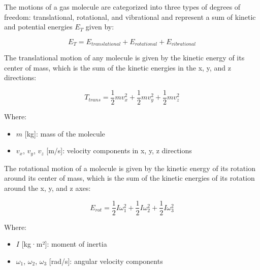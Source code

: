 \documentclass[../main]{subfiles}
\begin{document}
The motions of a gas molecule are categorized into three types of degrees of freedom: translational, rotational, and vibrational and represent a sum of kinetic and potential energies ${E_{T}}$ given by:

\vspace{0mm}
\begin{equation}
    E_{T} = E_{translational} + E_{rotational} + E_{vibrational}
    \label{e:degrees_of_freedom}
\end{equation}
\vspace{0mm}

The translational motion of any molecule is given by the kinetic energy of its center of mass, which is the sum of the kinetic energies in the x, y, and z directions:

\vspace{0mm}
\begin{equation}
T_{trans} = \frac{1}{2}mv_{x}^2 + \frac{1}{2}mv_{y}^2 + \frac{1}{2}mv_{z}^2
\label{e:translational_energy}
\end{equation}
\vspace{0mm}

\vspace{0mm}
\begin{minipage}{\linewidth}
Where:
\begin{itemize}
    \item[] $m$ [kg]: mass of the molecule
    \item[] $v_x$, $v_y$, $v_z$ [m/s]: velocity components in x, y, z directions
\end{itemize}
\end{minipage}
\vspace{0mm}

The rotational motion of a molecule is given by the kinetic energy of its rotation around its center of mass, which is the sum of the kinetic energies of its rotation around the x, y, and z axes:

\vspace{0mm}
\begin{equation}
    E_{rot} = \frac{1}{2}I\omega_{1}^2 + \frac{1}{2}I\omega_{2}^2 + \frac{1}{2}I\omega_{3}^2
\label{e:rotational_energy}
\end{equation}
\vspace{0mm}

\vspace{0mm}
\begin{minipage}{\linewidth}
Where:
\begin{itemize}
    \item[] $I$ [kg·m²]: moment of inertia
    \item[] $\omega_1$, $\omega_2$, $\omega_3$ [rad/s]: angular velocity components
\end{itemize}
\end{minipage}
\vspace{0mm}
\end{document}
